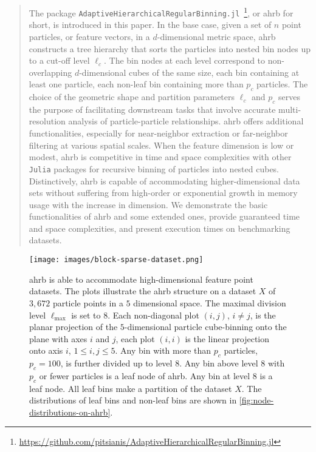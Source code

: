 \documentclass[final]{juliacon}
\begin{document}
%
%
%

 \begin{abstract}
   The package 
   \texttt{\small AdaptiveHierarchicalRegularBinning.jl}~\footnote{\href{https://github.com/pitsianis/AdaptiveHierarchicalRegularBinning.jl}{https://github.com/pitsianis/AdaptiveHierarchicalRegularBinning.jl}},
   or {\sc ahrb} for short, is introduced in this paper.  In the base case,
   given a set of $n$ point particles, or feature vectors, in a
   $d$-dimensional metric space, {\sc ahrb} constructs a tree
   hierarchy that sorts the particles into nested bin nodes up to a
   cut-off level $\ell_{c}$.  The bin nodes at each level correspond
   to non-overlapping $d$-dimensional cubes of the same size, each bin
   containing at least one particle, each non-leaf bin containing more
   than $p_c$ particles.  The choice of the geometric shape and
   partition parameters $\ell_{c}$ and $p_{c}$ serves the purpose of
   facilitating downstream tasks that involve accurate
   multi-resolution analysis of particle-particle relationships.  {\sc
     ahrb} offers additional functionalities, especially for
   near-neighbor extraction or far-neighbor filtering at various
   spatial scales.  When the feature dimension is low or modest, {\sc
     ahrb} is competitive in time and space complexities with other
   \texttt{Julia} packages for recursive binning of particles into nested
   cubes. Distinctively, {\sc ahrb} is capable of accommodating
   higher-dimensional data sets without suffering from high-order or
   exponential growth in memory usage with the increase in dimension.
   We demonstrate the basic functionalities of {\sc ahrb} and some
   extended ones, provide guaranteed time and space complexities, and
   present execution times on benchmarking datasets.
\end{abstract} 



%
%
%
 
%
%
%
%
%
%
%
%
%
%

\begin{figure}
  \centering
  \texttt{[image: images/block-sparse-dataset.png]}
  \caption{%
    {\sc ahrb} is able to accommodate high-dimensional feature point
    datasets. The plots illustrate the {\sc ahrb} structure on a
    dataset $X$ of $3,672$ particle points in a $5$ dimensional
    space. The maximal division level $\ell_{\max}$ is set to $8$.
    Each non-diagonal plot $(i,j)$, $i\neq j$, is the planar
    projection of the $5$-dimensional particle cube-binning onto the
    plane with axes $i$ and $j$, each plot $(i,i)$ is the linear
    projection onto axis $i$, $1\leq i,j \leq 5$.  Any bin with more
    than $p_{c}$ particles, $p_{c}=100$, is further divided up to
    level $8$. Any bin above level $8$ with $p_c$ or fewer particles
    is a leaf node of {\sc ahrb}. Any bin at level $8$ is a leaf
    node. All leaf bins make a partition of the dataset $X$. The
    distributions of leaf bins and non-leaf bins are shown in
    \cref{fig:node-distributions-on-ahrb}.} %
  \label{fig:ahrb-structures-illustration} 
\end{figure} %
\end{document}
